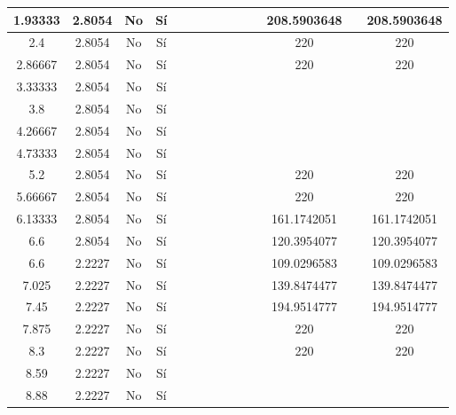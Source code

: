 \begin{table}[H]
{\begin{tabular}{|c|c|c|c|c|c|c|c|c|c|c|c|c|c|}
1.93333 & 2.8054 & No  & Sí  &     &     &     &     &     &     &     & 208.5903648 &     & 208.5903648 \bigstrut\\
\hline
2.4 & 2.8054 & No  & Sí  &     &     &     &     &     &     &     & 220 &     & 220 \bigstrut\\
\hline
2.86667 & 2.8054 & No  & Sí  &     &     &     &     &     &     &     & 220 &     & 220 \bigstrut\\
\hline
3.33333 & 2.8054 & No  & Sí  &     &     &     &     &     &     &     &     &     &  \bigstrut\\
\hline
3.8 & 2.8054 & No  & Sí  &     &     &     &     &     &     &     &     &     &  \bigstrut\\
\hline
4.26667 & 2.8054 & No  & Sí  &     &     &     &     &     &     &     &     &     &  \bigstrut\\
\hline
4.73333 & 2.8054 & No  & Sí  &     &     &     &     &     &     &     &     &     &  \bigstrut\\
\hline
5.2 & 2.8054 & No  & Sí  &     &     &     &     &     &     &     & 220 &     & 220 \bigstrut\\
\hline
5.66667 & 2.8054 & No  & Sí  &     &     &     &     &     &     &     & 220 &     & 220 \bigstrut\\
\hline
6.13333 & 2.8054 & No  & Sí  &     &     &     &     &     &     &     & 161.1742051 &     & 161.1742051 \bigstrut\\
\hline
6.6 & 2.8054 & No  & Sí  &     &     &     &     &     &     &     & 120.3954077 &     & 120.3954077 \bigstrut\\
\hline
6.6 & 2.2227 & No  & Sí  &     &     &     &     &     &     &     & 109.0296583 &     & 109.0296583 \bigstrut\\
\hline
7.025 & 2.2227 & No  & Sí  &     &     &     &     &     &     &     & 139.8474477 &     & 139.8474477 \bigstrut\\
\hline
7.45 & 2.2227 & No  & Sí  &     &     &     &     &     &     &     & 194.9514777 &     & 194.9514777 \bigstrut\\
\hline
7.875 & 2.2227 & No  & Sí  &     &     &     &     &     &     &     & 220 &     & 220 \bigstrut\\
\hline
8.3 & 2.2227 & No  & Sí  &     &     &     &     &     &     &     & 220 &     & 220 \bigstrut\\
\hline
8.59 & 2.2227 & No  & Sí  &     &     &     &     &     &     &     &     &     &  \bigstrut\\
\hline
8.88 & 2.2227 & No  & Sí  &     &     &     &     &     &     &     &     &     &  \bigstrut\\

\end{tabular}}
\end{table}
